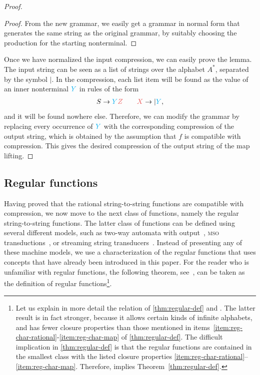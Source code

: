 \documentclass[a4paper,UKenglish,cleveref, autoref, thm-restate]{lipics-v2021}
\newcommand{\red}[1]{{\color{red}#1}}
\newcommand{\blue}[1]{{\color{cyan}#1}}
\newcommand{\mso}{{\textsc{mso}}\xspace}
\begin{document}
\begin{proof}
\begin{proof}
        From the new grammar, we easily get a grammar in normal form that generates the same string as the original grammar, by suitably choosing the production for the starting nonterminal.
    \end{proof}
    Once we have normalized the input compression, we can easily prove the lemma. 
    The input string can be seen as a list of strings over the alphabet $A^*$, separated by the symbol $|$. In the compression, each list item will be found as the value of an inner nonterminal $\blue Y$  in rules of the form
    \begin{align*}
    S \to \blue Y \red Z \qquad \red X \to  |\blue Y,
    \end{align*}
    and it will be found nowhere else. Therefore, we can modify the grammar by replacing every occurrence of $\blue Y$ with the corresponding compression of the output string, which is obtained by the assumption that $f$ is compatible with compression. This gives the desired compression of the output string of the map lifting.
\end{proof}

\subsection{Regular functions}
\label{sec:regular}
Having proved that the rational string-to-string functions are compatible with compression, we now move to the next class of functions, namely the regular string-to-string functions. The latter class of  functions can be defined  using several different models, such as two-way automata with output~\cite{shepherdson1959reduction}, \mso transductions~\cite{engelfrietMSODefinableString2001}, or streaming string transducers~\cite{alurExpressivenessStreamingString2010}. Instead of presenting any of these machine models, we use a characterization of the regular functions that uses concepts that have already been introduced in this paper. For the reader who is unfamiliar with regular functions, the following theorem, see~\cite[Theorem 18]{bojanczykstefanski2020},  can be taken as the definition of regular functions\footnote{Let us explain in more detail the relation of \cref{thm:regular-def} and \cite[Theorem 18]{bojanczykstefanski2020}. The latter result is in fact stronger, because it allows certain kinds of infinite alphabets, and has fewer closure properties than those mentioned in items~\ref{item:reg-char-rational}-\ref{item:reg-char-map} of \cref{thm:regular-def}. The difficult implication in 
\cref{thm:regular-def} is that the regular functions are contained in the  smallest class with the listed closure properties \ref{item:reg-char-rational}--\ref{item:reg-char-map}.
Therefore,  \cite[Theorem 18]{bojanczykstefanski2020} implies Theorem~\ref{thm:regular-def}.}.
\end{document}
